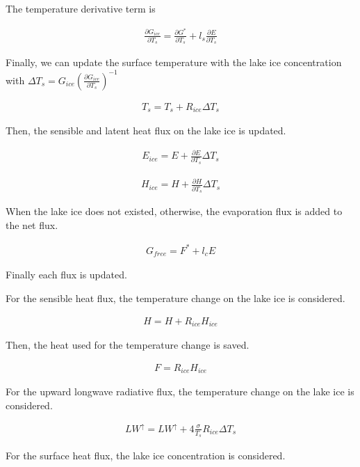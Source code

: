The temperature derivative term is

\begin{eqnarray}
    \frac{\partial G_{ice}}{\partial T_s}=\frac{\partial G^*}{\partial T_s} + l_s\frac{\partial E}{\partial T_s}
\end{eqnarray}

Finally, we can update the surface temperature with the lake ice
concentration with
\(\Delta T_s=G_{ice} ( \frac{\partial G_{ice}}{\partial T_s})^{-1}\)

\begin{eqnarray}
    T_s = T_s +R_{ice} \Delta T_s
\end{eqnarray}

Then, the sensible and latent heat flux on the lake ice is updated.

\begin{eqnarray}
    E_{ice} = E + \frac{\partial E}{\partial T_s}\Delta T_s
\end{eqnarray}

\begin{eqnarray}
    H_{ice} = H + \frac{\partial H}{\partial T_s}\Delta T_s
\end{eqnarray}

When the lake ice does not existed, otherwise, the evaporation flux is
added to the net flux.

\begin{eqnarray}
    G_{free}=F^* + l_cE
\end{eqnarray}

Finally each flux is updated.

For the sensible heat flux, the temperature change on the lake ice is
considered.

\begin{eqnarray}
    H=H+ R_{ice}  H_{ice}
\end{eqnarray}

Then, the heat used for the temperature change is saved.

\begin{eqnarray}
    F = R_{ice} H_{ice}
\end{eqnarray}

For the upward longwave radiative flux, the temperature change on the
lake ice is considered.

\begin{eqnarray}
    LW^\uparrow=LW^\uparrow +  4\frac{\sigma}{T_s}R_{ice}  \Delta T_s
\end{eqnarray}

For the surface heat flux, the lake ice concentration is considered.

